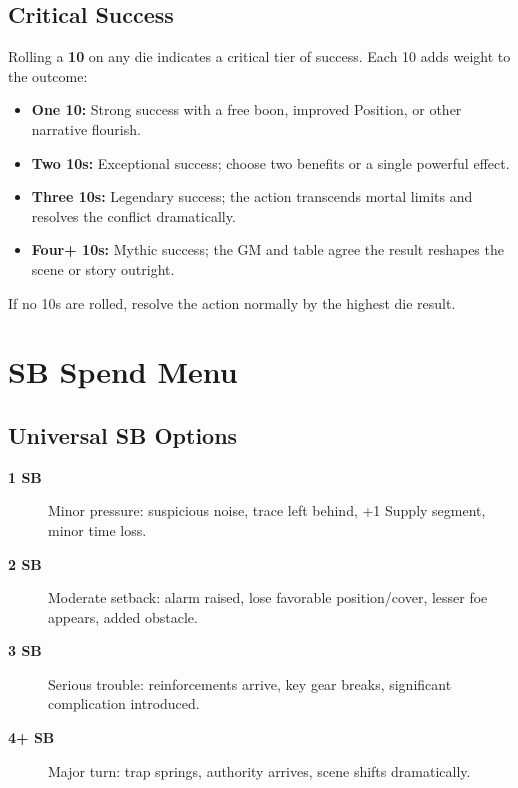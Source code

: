 \subsection{Critical Success}
Rolling a \textbf{10} on any die indicates a critical tier of success. Each 10 adds weight to the outcome:

\begin{itemize}
  \item \textbf{One 10:} Strong success with a free boon, improved Position, or other narrative flourish.
  \item \textbf{Two 10s:} Exceptional success; choose two benefits or a single powerful effect.
  \item \textbf{Three 10s:} Legendary success; the action transcends mortal limits and resolves the conflict dramatically.
  \item \textbf{Four+ 10s:} Mythic success; the GM and table agree the result reshapes the scene or story outright.
\end{itemize}

\noindent
If no 10s are rolled, resolve the action normally by the highest die result.

\section{SB Spend Menu}
\label{sec:sb-spend-menu}

\subsection{Universal SB Options}
\label{subsec:universal-sb}

\begin{description}
\item[\textbf{1 SB}] Minor pressure: suspicious noise, trace left behind, +1 Supply segment, minor time loss. 
\item[\textbf{2 SB}] Moderate setback: alarm raised, lose favorable position/cover, lesser foe appears, added obstacle. 
\item[\textbf{3 SB}] Serious trouble: reinforcements arrive, key gear breaks, significant complication introduced. 
\item[\textbf{4+ SB}] Major turn: trap springs, authority arrives, scene shifts dramatically. 
\end{description}

